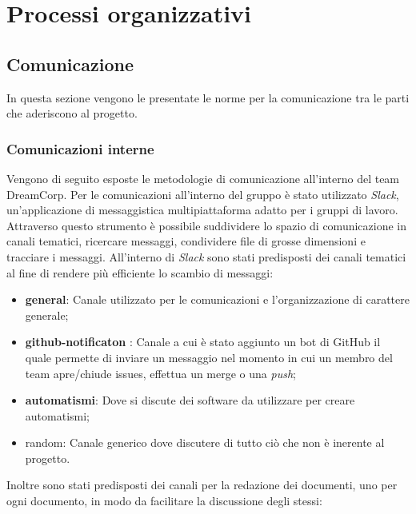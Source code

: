 \section{Processi organizzativi}
    \subsection{Comunicazione}
        In questa sezione vengono le presentate le norme per la comunicazione tra le parti che aderiscono al progetto.
        \subsubsection{Comunicazioni interne}
            Vengono di seguito esposte le metodologie di comunicazione all'interno del team DreamCorp.
            \newline
            Per le comunicazioni all'interno del gruppo è stato utilizzato \textit{Slack}, un'applicazione di messaggistica multipiattaforma adatto per i gruppi di lavoro. Attraverso questo strumento è possibile suddividere lo spazio di comunicazione in canali tematici, ricercare messaggi, condividere file di grosse dimensioni e tracciare i messaggi.
            \newline
            All'interno di \textit{Slack} sono stati predisposti dei canali tematici al fine di rendere più efficiente lo scambio di messaggi:
            \begin{itemize}
                \item \textbf{general}: Canale utilizzato per le comunicazioni e l'organizzazione di carattere generale;
                \item \textbf{github-notificaton} : Canale a cui è stato aggiunto un bot di GitHub il quale permette di inviare un messaggio nel momento in cui un membro del team apre/chiude issues, effettua un merge o una \textit{push};
                \item \textbf{automatismi}: Dove si discute dei software da utilizzare per creare automatismi;
                \item{random}: Canale generico dove discutere di tutto ciò che non è inerente al progetto.    
            \end{itemize}
            \newline
            Inoltre sono stati predisposti dei canali per la redazione dei documenti, uno per ogni documento, in modo da facilitare la discussione degli stessi:
